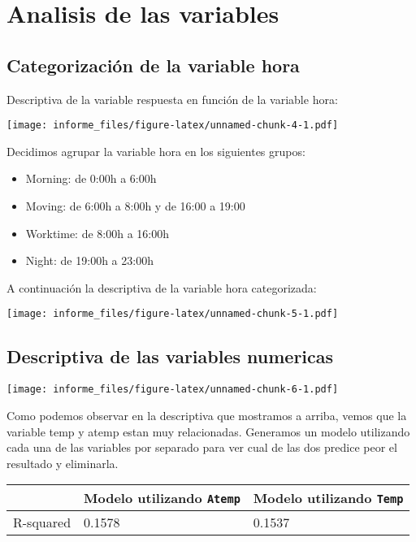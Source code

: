 \documentclass[
]{article}
\providecommand{\tightlist}{%
  \setlength{\itemsep}{0pt}\setlength{\parskip}{0pt}}
\begin{document}
\hypertarget{analisis-de-las-variables}{%
\section{Analisis de las variables}\label{analisis-de-las-variables}}

\hypertarget{categorizaciuxf3n-de-la-variable-hora}{%
\subsection{Categorización de la variable
hora}\label{categorizaciuxf3n-de-la-variable-hora}}

Descriptiva de la variable respuesta en función de la variable hora:

\texttt{[image: informe\_files/figure-latex/unnamed-chunk-4-1.pdf]}

Decidimos agrupar la variable hora en los siguientes grupos:

\begin{itemize}
\tightlist
\item
  Morning: de 0:00h a 6:00h
\item
  Moving: de 6:00h a 8:00h y de 16:00 a 19:00
\item
  Worktime: de 8:00h a 16:00h
\item
  Night: de 19:00h a 23:00h
\end{itemize}

A continuación la descriptiva de la variable hora categorizada:

\texttt{[image: informe\_files/figure-latex/unnamed-chunk-5-1.pdf]}

\hypertarget{descriptiva-de-las-variables-numericas}{%
\subsection{Descriptiva de las variables
numericas}\label{descriptiva-de-las-variables-numericas}}

\texttt{[image: informe\_files/figure-latex/unnamed-chunk-6-1.pdf]}

Como podemos observar en la descriptiva que mostramos a arriba, vemos
que la variable temp y atemp estan muy relacionadas. Generamos un modelo
utilizando cada una de las variables por separado para ver cual de las
dos predice peor el resultado y eliminarla.

\begin{longtable}[]{@{}lll@{}}
\toprule
& Modelo utilizando \texttt{Atemp} & Modelo utilizando
\texttt{Temp}\tabularnewline
\midrule
\endhead
R-squared & 0.1578 & 0.1537\tabularnewline
\bottomrule
\end{longtable}
\end{document}
